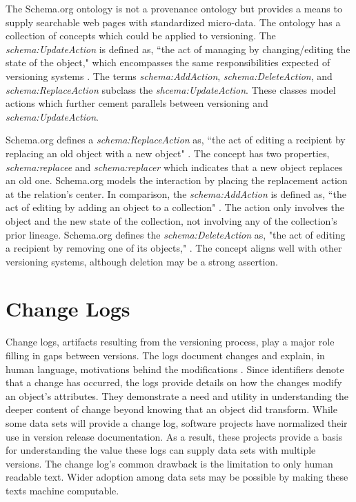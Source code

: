 The Schema.org ontology is not a provenance ontology but provides a means to supply searchable web pages with standardized micro-data.
The ontology has a collection of concepts which could be applied to versioning.
The \textit{schema:UpdateAction} is defined as, ``the act of managing by changing/editing the state of the object," which encompasses the same responsibilities expected of versioning systems \cite{Schema}.
The terms \textit{schema:AddAction}, \textit{schema:DeleteAction}, and \textit{schema:ReplaceAction} subclass the \textit{shcema:UpdateAction}.
These classes model actions which further cement parallels between versioning and \textit{schema:UpdateAction}.

Schema.org defines a \textit{schema:ReplaceAction} as, ``the act of editing a recipient by replacing an old object with a new object" \cite{SchemaRep}.
The concept has two properties, \textit{schema:replacee} and \textit{schema:replacer} which indicates that a new object replaces an old one.
Schema.org models the interaction by placing the replacement action at the relation's center.
In comparison, the \textit{schema:AddAction} is defined as, ``the act of editing by adding an object to a collection" \cite{SchemaAdd}.
The action only involves the object and the new state of the collection, not involving any of the collection's prior lineage.
Schema.org defines the \textit{schema:DeleteAction} as, "the act of editing a recipient by removing one of its objects," \cite{SchemaRem}.
The concept aligns well with other versioning systems, although deletion may be a strong assertion.

\section{Change Logs} \label{sec:changelog}

Change logs, artifacts resulting from the versioning process, play a major role filling in gaps between versions.
The logs document changes and explain, in human language, motivations behind the modifications \cite{uel1037}.
Since identifiers denote that a change has occurred, the logs provide details on how the changes modify an object's attributes.
They demonstrate a need and utility in understanding the deeper content of change beyond knowing that an object did transform.
While some data sets will provide a change log, software projects have normalized their use in version release documentation.
As a result, these projects provide a basis for understanding the value these logs can supply data sets with multiple versions.
The change log's common drawback is the limitation to only human readable text.
Wider adoption among data sets may be possible by making these texts machine computable.

